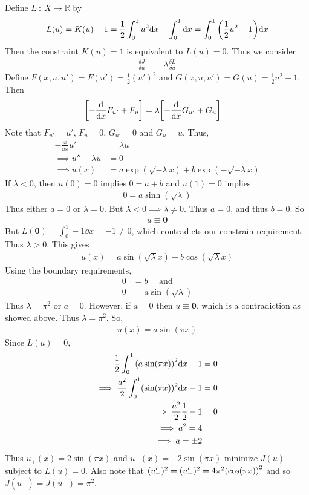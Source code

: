 \documentclass[12pt]{article}
\theoremstyle{plain}
\begin{document}
Define $L\ :\ X \rightarrow \mathbb{R}$ by
\begin{align*}
    L(u) = K(u) - 1 = \frac{1}{2}\int_0^1 u^2 \dd x - \int_0^1 \dd x = \int_0^1 \qty(\frac{1}{2}u^2 - 1) \dd x
\end{align*}
Then the constraint $K(u) = 1$ is equivalent to $L(u) = 0$.  Thus we consider
\begin{align*}
    \frac{\delta J}{\delta u} &= \lambda \frac{\delta L}{\delta u}
\end{align*}
Define $F(x, u, u') = F(u') = \frac{1}{2}(u')^2$ and $G(x, u, u') = G(u) = \frac{1}{2}u^2 - 1$.
Then
\begin{align*}
    \qty[-\frac{\dd}{\dd x}F_{u'} + F_u] &= \lambda\qty[-\frac{\dd}{\dd x}G_{u'} + G_u]
\end{align*}
Note that $F_{u'} = u'$, $F_u = 0$, $G_{u'} = 0$ and $G_u = u$.  Thus,
\begin{align*}
    -\frac{\dd}{\dd x} u' &= \lambda u \\
    \implies u'' + \lambda u &= 0 \\
    \implies u(x) &= a \exp(\sqrt{-\lambda}x) + b \exp(-\sqrt{-\lambda}x)
\end{align*}
If $\lambda < 0$, then $u(0) = 0$ implies $0 = a + b$ and $u(1) = 0$ implies
\begin{align*}
    0 = a\sinh(\sqrt{\lambda})
\end{align*}
Thus either $a = 0$ or $\lambda = 0$.  But $\lambda < 0 \implies \lambda \neq 0$.  Thus $a = 0$, and thus $b = 0$.  So
\begin{align*}
    u \equiv \textbf{0}
\end{align*}
But $L(\textbf{0}) = \int_0^1 -1 \dd x = -1 \neq 0$, which contradicts our constrain requirement.  Thus $\lambda > 0$.  This gives
\begin{align*}
    u(x) = a\sin(\sqrt{\lambda}x) + b\cos(\sqrt{\lambda}x)
\end{align*}
Using the boundary requirements,
\begin{align*}
    0 &= b\ \ \ \ \ \ \text{and} \\
    0 &= a\sin(\sqrt{\lambda})
\end{align*}
Thus $\lambda = \pi^2$ or $a = 0$.  However, if $a = 0$ then $u \equiv \textbf{0}$, which is a contradiction as showed above.  Thus $\lambda = \pi^2$.  So,
\begin{align*}
    u(x) = a\sin(\pi x)
\end{align*}
Since $L(u) = 0$,
\begin{align*}
    \frac{1}{2}\int_0^1\qty(a\sin(\pi x))^2 \dd x - 1 &= 0 \\
    \implies \frac{a^2}{2}\int_0^1 (\sin(\pi x))^2 \dd x - 1 &= 0 \\
    \implies \frac{a^2}{2} \frac{1}{2} - 1 &= 0 \\
    \implies a^2 = 4 \\ 
    \implies a = \pm 2
\end{align*}
Thus $u_+(x) = 2\sin(\pi x)$ and $u_-(x) = -2\sin(\pi x)$ minimize $J(u)$ subject to $L(u) = 0$.  Also note that $(u_+')^2 = (u_-')^2 = 4\pi^2\qty(\cos(\pi x))^2$ and so $J(u_+) = J(u_-) = \pi^2$.
\end{document}
